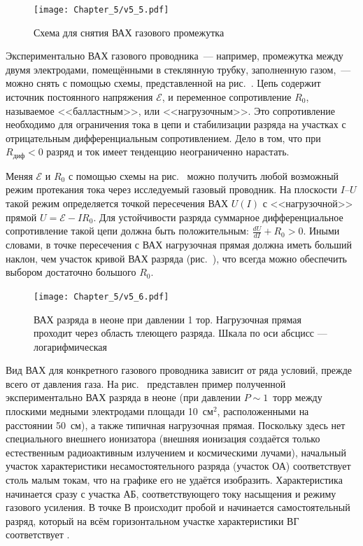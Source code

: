 \begin{figure}
    \centering
    \texttt{[image: Chapter\_5/v5\_5.pdf]}
    \caption{Схема для снятия ВАХ газового промежутка}
\end{figure}

Экспериментально ВАХ газового проводника~--- например, промежутка между двумя
электродами, помещёнными в стеклянную трубку, заполненную газом,~---
можно снять с помощью схемы, представленной на рис.~.
Цепь содержит источник постоянного напряжения $\mathcal{E}$,
и переменное сопротивление $R_0$, называемое <<балластным>>, или <<нагрузочным>>.
Это сопротивление необходимо для ограничения тока в цепи и стабилизации разряда
на участках с отрицательным дифференциальным сопротивлением. Дело в том, что
при $R_{диф} < 0$ разряд  и ток имеет тенденцию неограниченно
нарастать.

Меняя $\mathcal{E}$ и $R_0$ с помощью схемы на рис.~
можно получить любой возможный режим протекания тока через исследуемый газовый проводник.
На плоскости $I$--$U$ такой режим определяется точкой пересечения ВАХ $U(I)$
с <<нагрузочной>> прямой $U=\mathcal{E}-IR_0$.
Для устойчивости разряда суммарное дифференциальное сопротивление такой цепи должна быть
положительным: $\frac{dU}{dI} + R_0 > 0$. Иными словами, в точке пересечения с ВАХ
нагрузочная прямая должна иметь больший наклон,
чем участок кривой ВАХ разряда (рис.~),
что всегда можно обеспечить выбором достаточно большого $R_0$.

\begin{figure}[h!]
    \centering
    \texttt{[image: Chapter\_5/v5\_6.pdf]}
    \caption{ВАХ разряда в неоне при давлении 1 тор. Нагрузочная прямая проходит через область тлеющего разряда. Шкала по оси абсцисс --- логарифмическая}
\end{figure}

Вид ВАХ для конкретного газового проводника зависит от ряда условий, прежде
всего от давления газа. На рис.~ представлен пример
полученной экспериментально ВАХ разряда в неоне (при давлении $P\sim 1$~торр
между плоскими медными электродами площади 10~см$^2$, расположенными на
расстоянии 50~см), а также типичная нагрузочная прямая. Поскольку
здесь нет специального внешнего ионизатора (внешняя ионизация создаётся только
естественным радиоактивным излучением и космическими лучами), начальный участок
характеристики несамостоятельного разряда (участок ОА) соответствует столь
малым токам, что на графике его не удаётся изобразить. Характеристика
начинается сразу с участка АБ, соответствующего току насыщения и режиму
газового усиления. В точке В происходит пробой и начинается самостоятельный
разряд, который на всём горизонтальном участке характеристики ВГ соответствует
.


